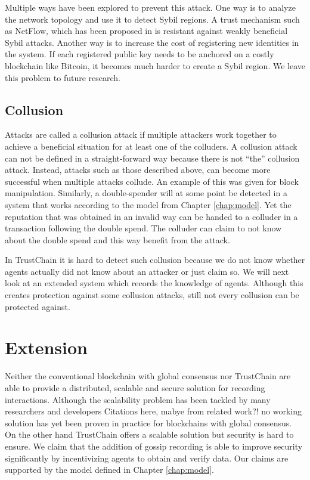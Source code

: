 Multiple ways have been explored to prevent this attack. One way is to analyze the network topology
and use it to detect Sybil regions. A trust mechanism such as NetFlow, which has been proposed in 
\cite{OTTE2017} is resistant against weakly beneficial Sybil attacks. Another way is to increase the cost of 
registering new identities in the system. If each registered public key needs to be anchored on a 
costly blockchain like Bitcoin, it becomes much harder to create a Sybil region. We leave this problem
to future research.

\subsection{Collusion}
\label{sec:collusion}
Attacks are called a collusion attack if multiple attackers work together to achieve a beneficial
situation for at least one of the colluders. A collusion attack can not be defined in a straight-forward
way because there is not ``the'' collusion attack. Instead, attacks such as those described above, 
can become more successful when multiple attacks collude. An example of this was given for block 
manipulation. Similarly, a double-spender will at some point be detected in a system that works 
according to the model from Chapter \ref{chap:model}. Yet the reputation that was obtained in an 
invalid way can be handed to a colluder in a transaction following the double spend. The colluder 
can claim to not know about the double spend and this way benefit from the attack.

In TrustChain it is hard to detect such collusion because we do not know whether agents actually 
did not know about an attacker or just claim so. We will next look at an extended system which 
records the knowledge of agents. Although this creates protection against some collusion attacks, 
still not every collusion can be protected against.

\section{Extension}
\label{sec:extension}
Neither the conventional blockchain with global consensus nor TrustChain are able to provide a 
distributed, scalable and secure solution for recording interactions. Although the scalability 
problem has been tackled by many researchers and developers {\color{red} Citations here, mabye from related work?!}
no working solution has yet been proven in practice for blockchains with global consensus. On the 
other hand TrustChain offers a scalable solution but security is hard to ensure. We claim that the 
addition of gossip recording is able to improve security significantly by incentivizing agents to 
obtain and verify data. Our claims are supported by the model defined in Chapter \ref{chap:model}.

